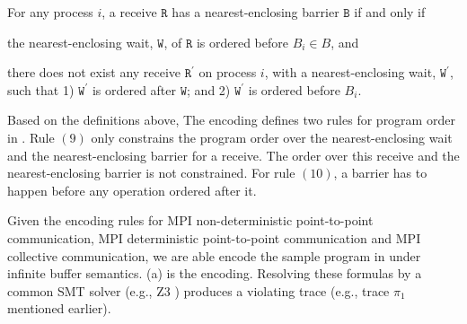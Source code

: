 \begin{definition}\label{def:nb}
For any process $i$, a receive $\mathtt{R}$ has a nearest-enclosing barrier $\mathtt{B}$ if and only if
\begin{compactenum}
\item the nearest-enclosing wait, $\mathtt{W}$, of $\mathtt{R}$ is ordered before $B_i\in B$, and
\item there does not exist any receive $\mathtt{R^\prime}$ on process $i$, with a nearest-enclosing wait, $\mathtt{W^\prime}$, such that 1) $\mathtt{W^\prime}$ is ordered after $\mathtt{W}$; and 2) $\mathtt{W^\prime}$ is ordered before $B_i$.
\end{compactenum}
\end{definition}

Based on the definitions above, The encoding defines two rules for program order in . Rule $(9)$ only constrains the program order over the nearest-enclosing wait and the nearest-enclosing barrier for a receive. The order over this receive and the nearest-enclosing barrier is not constrained. For rule $(10)$, a barrier has to happen before any operation ordered after it. 

Given the encoding rules for MPI non-deterministic point-to-point communication, MPI deterministic point-to-point communication and MPI collective communication, we are able encode the sample program in  under infinite buffer semantics. (a) is the encoding. Resolving these formulas by a common SMT solver (e.g., Z3 \cite{demoura:tacas08}) produces a violating trace (e.g., trace $\pi_1$ mentioned earlier). 


\encodingcc

\exampleencoding
